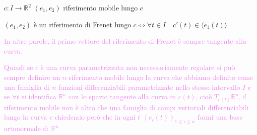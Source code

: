         \begin{esempio}
        $c \colon I \to \mathbb{R}^2$ $(e_1, e_2)$ riferimento mobile lungo $c$ 

        $(e_1, e_2)$ è un riferimento di Frenet lungo $c \iff \forall t \in I \quad c'(t) \in \langle e_1(t) \rangle$
        
        \textcolor{violet}{In altre parole, il primo vettore del riferimento di Frenet è sempre tangente alla curva.}
        \begin{center}
        \end{center}
        \end{esempio}
        \textcolor{violet}{Quindi se $c$ è una curva parametrizzata non necessariamente regolare si può sempre 
        definire un $n$-riferimento mobile lungo la curva che abbiamo definito come una famiglia di $n$ funzioni differenziabili parametrizzate nello 
        stesso intervallo $I$ e se $\forall t$ si identifica $\mathbb{R}^n$ con lo spazio tangente alla curva in $c(t)$, cioè $T_{c(t)}\mathbb{R}^n$,
        il riferimento mobile non è altro che una famiglia di campi vettoriali differenziabili lungo la curva $c$ chiedendo però che in ogni $t$ $\left(e_i (t)\right)_{1 \leq i \leq n}$
        formi una base ortonormale di $\mathbb{R}^n$}

